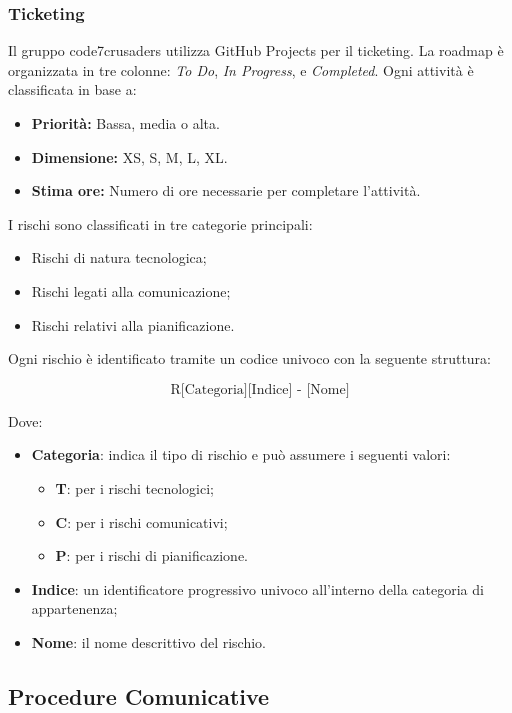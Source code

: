 \subsubsection{Ticketing}
Il gruppo code7crusaders utilizza GitHub Projects per il ticketing. La roadmap è organizzata in tre colonne: \textit{To Do}, \textit{In Progress}, e \textit{Completed}. Ogni attività è classificata in base a:
\begin{itemize}
    \item \textbf{Priorità:} Bassa, media o alta.
    \item \textbf{Dimensione:} XS, S, M, L, XL.
    \item \textbf{Stima ore:} Numero di ore necessarie per completare l’attività.
\end{itemize}

I rischi sono classificati in tre categorie principali:
\begin{itemize}
    \item Rischi di natura tecnologica;
    \item Rischi legati alla comunicazione;
    \item Rischi relativi alla pianificazione.
\end{itemize}

Ogni rischio è identificato tramite un codice univoco con la seguente struttura:

\[
\text{R[Categoria][Indice] - [Nome]}
\]

Dove:
\begin{itemize}
    \item \textbf{Categoria}: indica il tipo di rischio e può assumere i seguenti valori:
    \begin{itemize}
        \item \textbf{T}: per i rischi tecnologici;
        \item \textbf{C}: per i rischi comunicativi;
        \item \textbf{P}: per i rischi di pianificazione.
    \end{itemize}
    \item \textbf{Indice}: un identificatore progressivo univoco all'interno della categoria di appartenenza;
    \item \textbf{Nome}: il nome descrittivo del rischio.
\end{itemize}

\subsection{Procedure Comunicative}

